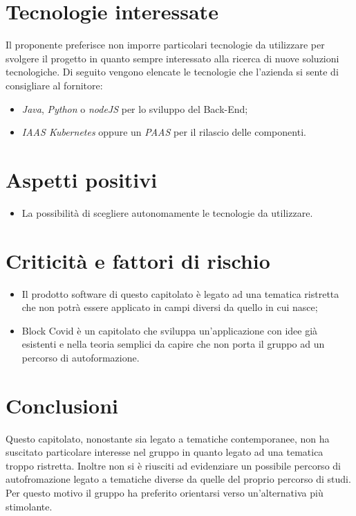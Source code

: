 \section{Tecnologie interessate}
Il proponente preferisce non imporre particolari tecnologie da utilizzare per svolgere il progetto in quanto sempre interessato alla ricerca di nuove soluzioni tecnologiche. Di seguito vengono elencate le tecnologie che l'azienda si sente di consigliare al fornitore:
\begin{itemize}
	\item \textit{Java}, \textit{Python} o \textit{nodeJS} per lo sviluppo del Back-End;
	\item \textit{IAAS Kubernetes} oppure un \textit{PAAS} per il rilascio delle componenti.
\end{itemize}
\section{Aspetti positivi}
\begin{itemize}
	\item La possibilità di scegliere autonomamente le tecnologie da utilizzare.
\end{itemize}
\section{Criticità e fattori di rischio}
\begin{itemize}
	\item Il prodotto software di questo capitolato è legato ad una tematica ristretta che non potrà essere applicato in campi diversi da quello in cui nasce;
	\item Block Covid è un capitolato che sviluppa un'applicazione con idee già esistenti e nella teoria semplici da capire che non porta il gruppo ad un percorso di autoformazione.
\end{itemize}
\section{Conclusioni}
Questo capitolato, nonostante sia legato a tematiche contemporanee, non ha suscitato particolare interesse nel gruppo in quanto legato ad una tematica troppo ristretta. Inoltre non si è riusciti ad evidenziare un possibile percorso di autofromazione legato a tematiche diverse da quelle del proprio percorso di studi. Per questo motivo il gruppo ha preferito orientarsi verso un'alternativa più stimolante.